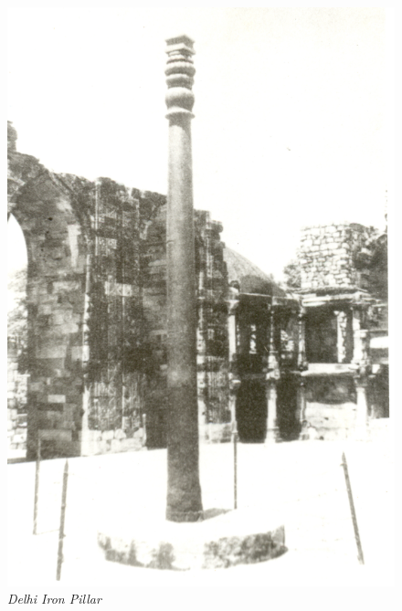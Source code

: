 \begin{figure}[H]
\renewcommand{\thefigure}{28 A, B}
\includegraphics[scale=.6]{images/chapter-5/Fig28B.jpg}
\caption{\textit{Delhi Iron Pillar}}\label{chpater-005-fig28AB}
\end{figure}

\newpage

